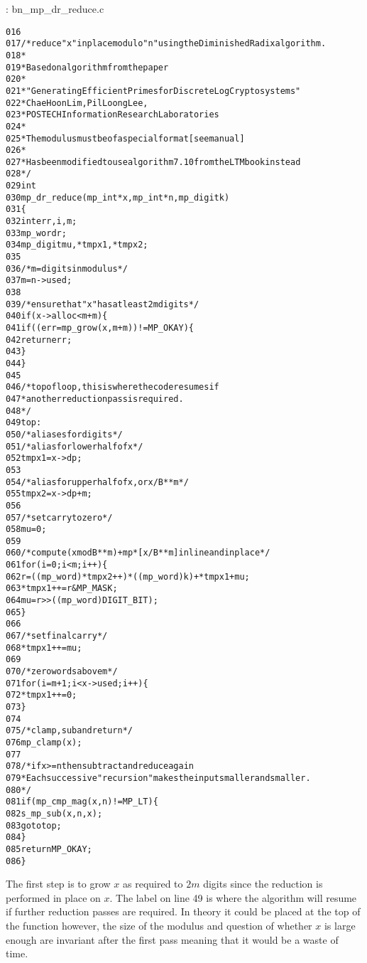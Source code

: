 \documentclass[b5paper]{book}
\begin{document}
\vspace{+3mm}\begin{small}
\hspace{-5.1mm}{\bf File}: bn\_mp\_dr\_reduce.c
\vspace{-3mm}
\begin{alltt}
016   
017   /* reduce "x" in place modulo "n" using the Diminished Radix algorithm.
018    *
019    * Based on algorithm from the paper
020    *
021    * "Generating Efficient Primes for Discrete Log Cryptosystems"
022    *                 Chae Hoon Lim, Pil Loong Lee,
023    *          POSTECH Information Research Laboratories
024    *
025    * The modulus must be of a special format [see manual]
026    *
027    * Has been modified to use algorithm 7.10 from the LTM book instead
028    */
029   int
030   mp_dr_reduce (mp_int * x, mp_int * n, mp_digit k)
031   \{
032     int      err, i, m;
033     mp_word  r;
034     mp_digit mu, *tmpx1, *tmpx2;
035     
036     /* m = digits in modulus */
037     m = n->used;
038     
039     /* ensure that "x" has at least 2m digits */
040     if (x->alloc < m + m) \{
041       if ((err = mp_grow (x, m + m)) != MP_OKAY) \{
042         return err;
043       \}
044     \}
045   
046   /* top of loop, this is where the code resumes if 
047    * another reduction pass is required.
048    */
049   top:
050     /* aliases for digits */
051     /* alias for lower half of x */
052     tmpx1 = x->dp;
053     
054     /* alias for upper half of x, or x/B**m */
055     tmpx2 = x->dp + m;
056     
057     /* set carry to zero */
058     mu = 0;
059     
060     /* compute (x mod B**m) + mp * [x/B**m] inline and inplace */
061     for (i = 0; i < m; i++) \{
062         r         = ((mp_word)*tmpx2++) * ((mp_word)k) + *tmpx1 + mu;
063         *tmpx1++  = r & MP_MASK;
064         mu        = r >> ((mp_word)DIGIT_BIT);
065     \}
066     
067     /* set final carry */
068     *tmpx1++ = mu;
069     
070     /* zero words above m */
071     for (i = m + 1; i < x->used; i++) \{
072         *tmpx1++ = 0;
073     \}
074   
075     /* clamp, sub and return */
076     mp_clamp (x);
077   
078     /* if x >= n then subtract and reduce again 
079      * Each successive "recursion" makes the input smaller and smaller.
080      */
081     if (mp_cmp_mag (x, n) != MP_LT) \{
082       s_mp_sub(x, n, x);
083       goto top;
084     \}
085     return MP_OKAY;
086   \}
\end{alltt}
\end{small}

The first step is to grow $x$ as required to $2m$ digits since the reduction is performed in place on $x$.  The label on line 49 is where
the algorithm will resume if further reduction passes are required.  In theory it could be placed at the top of the function however, the size of
the modulus and question of whether $x$ is large enough are invariant after the first pass meaning that it would be a waste of time.  
\end{document}
